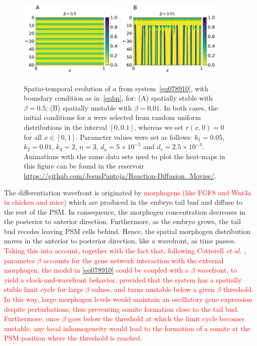 \documentclass[%
 preprint,
 aip, 
 amsmath,amssymb,
]{revtex4-2}
\begin{document}
	\begin{figure}[t!]
		\centering
		\includegraphics[width=2in]{Figures/Fig03aRev.pdf}
		\includegraphics[width=2in]{Figures/Fig03bRev.pdf}
		\caption{Spatio-temporal evolution of $a$ from system~\eqref{eq078910}, with
			boundary condition as in~\eqref{eqbn}, for: (A) spatially stable with
			$\beta=0.5$; (B) spatially unstable with $\beta=0.01$. In both cases, the
			initial conditions for $a$ were selected from random uniform distributions in
			the interval $[0, 0.1]$, whereas we set $r(x, 0) = 0$ for all $x\in[0,1]$.
			Parameter values were set as follows: $k_1=0.05$, $k_2=0.01$, $k_3=2$, $n=3$, $d_a =
			5\times10^{-5}$ and $d_r=2.5\times10^{-3}$. Animations with the same 
			data sets used to plot the heat-maps in this figure can be found in the 
			reservoir \url{https://github.com/JesusPantoja/Reaction-Diffusion_Movies/}.}
		\label{Fig03}
	\end{figure}

The differentiation wavefront is originated by \textcolor{red}{morphogens (like FGF8 and Wnt3a in chicken and mice)} which are produced in the embryo tail bud and diffuse to the rest of the PSM. In consequence, the morphogen concentration decreases in the posterior to anterior direction. Furthermore, as the embryo grows, the tail bud recedes leaving PSM cells behind. Hence, the spatial morphogen distribution moves in the anterior to posterior direction, like a wavefront, as time passes. \textcolor{red}{Taking this into account, together with the fact that, following Cotterell \emph{et al.} \citep{Cotterell2015}, parameter $\beta$ accounts for the gene network interaction with the external morphogen, the model in \eqref{eq078910} could be coupled with a $\beta$ wavefront, to yield a clock-and-wavefront behavior, provided that the system has a spatially stable limit cycle for large $\beta$ values, and turns unstable below a given $\beta$ threshold. In this way, large morphogen levels would maintain an oscillatory gene expression despite perturbations, thus preventing somite formation close to the tail bud. Furthermore, once $\beta$ goes below the threshold at which the limit cycle becomes unstable, any local inhomogeneity would lead to the formation of a somite at the PSM position where the threshold is reached.}
\end{document}
